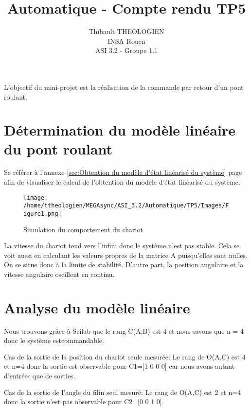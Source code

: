 \documentclass[a4paper,12pt]{article}
\title{Automatique - Compte rendu TP5}
\author{
	Thibault THEOLOGIEN\\
	INSA Rouen\\
	ASI 3.2 - Groupe 1.1
}
\begin{document}
	\maketitle
	\tableofcontents
	\newpage

  \par L'objectif du mini-projet est la réalisation de la commande par retour d'un pont roulant.

  \section{Détermination du modèle linéaire du pont roulant}
  \label{sec:Détermination du modèle linéaire du pont roulant}
    \par Se référer à l'annexe \ref{sec:Obtention du modèle d'état linéarisé du système} page \pageref{sec:Obtention du modèle d'état linéarisé du système}
    afin de visualiser le calcul de l'obtention du modèle d'état linéarisé du système.

    \begin{figure}[h]
      \caption{Simulation du comportement du chariot}
      \centering
      \texttt{[image: /home/ttheologien/MEGAsync/ASI\_3.2/Automatique/TP5/Images/Figure1.png]}
    \end{figure}

    \par La vitesse du chariot tend vers l'infini donc le système n'est pas stable.
    Cela se voit aussi en calculant les valeurs propres de la matrice A puisqu'elles sont nulles.
    On se situe donc à la limite de stabilité.
    D'autre part, la position angulaire et la vitesse angulaire oscillent en continu.
  \newpage

  \section{Analyse du modèle linéaire}
  \label{sec:Analyse du modèle linéaire}
    \par Nous trouvons grâce à Scilab que le rang C(A,B) est 4 et nous savons que n = 4 donc le système estcommandable.\\

    \par Cas de la sortie de la position du chariot seule mesurée:
    Le rang de O(A,C) est 4 et n=4 donc la sortie est observable pour C1=[1 0 0 0] car nous avons autant d'entrées que de sorties.\\

    \par Cas de la sortie de l'angle du filin seul mesuré:
    Le rang de O(A,C) est 2 et n=4 donc la sortie n'est pas observable pour C2=[0 0 1 0].\\
\end{document}
